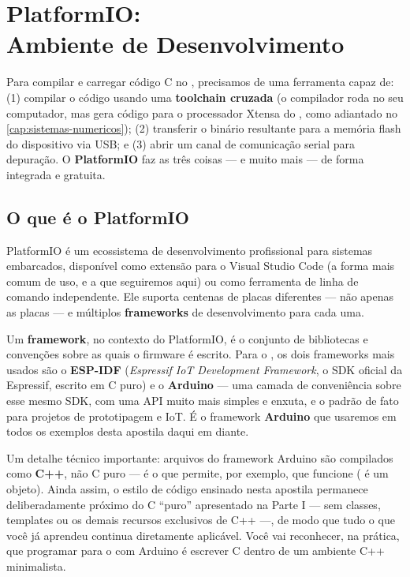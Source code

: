 \chapter[PlatformIO: Ambiente de Desenvolvimento]{PlatformIO:\\Ambiente de Desenvolvimento}
\label{cap:platformio}

Para compilar e carregar código C no \ESP{}, precisamos de uma ferramenta capaz de: (1) compilar o código usando uma \textbf{toolchain cruzada} (o compilador roda no seu computador, mas gera código para o processador Xtensa do \ESP{}, como adiantado no \cref{cap:sistemas-numericos}); (2) transferir o binário resultante para a memória flash do dispositivo via USB; e (3) abrir um canal de comunicação serial para depuração. O \textbf{PlatformIO} faz as três coisas — e muito mais — de forma integrada e gratuita.

\section{O que é o PlatformIO}

PlatformIO é um ecossistema de desenvolvimento profissional para sistemas embarcados, disponível como extensão para o Visual Studio Code (a forma mais comum de uso, e a que seguiremos aqui) ou como ferramenta de linha de comando independente. Ele suporta centenas de placas diferentes — não apenas as placas \ESP{} — e múltiplos \textbf{frameworks} de desenvolvimento para cada uma.

\begin{nota}
Um \textbf{framework}, no contexto do PlatformIO, é o conjunto de bibliotecas e convenções sobre as quais o firmware é escrito. Para o \ESP{}, os dois frameworks mais usados são o \textbf{ESP-IDF} (\emph{Espressif IoT Development Framework}, o SDK oficial da Espressif, escrito em C puro) e o \textbf{Arduino} — uma camada de conveniência sobre esse mesmo SDK, com uma API muito mais simples e enxuta, e o padrão de fato para projetos de prototipagem e IoT. É o framework \textbf{Arduino} que usaremos em todos os exemplos desta apostila daqui em diante.
\end{nota}

\begin{atencao}
Um detalhe técnico importante: arquivos do framework Arduino são compilados como \textbf{C++}, não C puro — é o que permite, por exemplo, que  funcione ( é um objeto). Ainda assim, o estilo de código ensinado nesta apostila permanece deliberadamente próximo do C ``puro'' apresentado na Parte I — sem classes, templates ou os demais recursos exclusivos de C++ —, de modo que tudo o que você já aprendeu continua diretamente aplicável. Você vai reconhecer, na prática, que programar para o \ESP{} com Arduino é escrever C dentro de um ambiente C++ minimalista.
\end{atencao}


